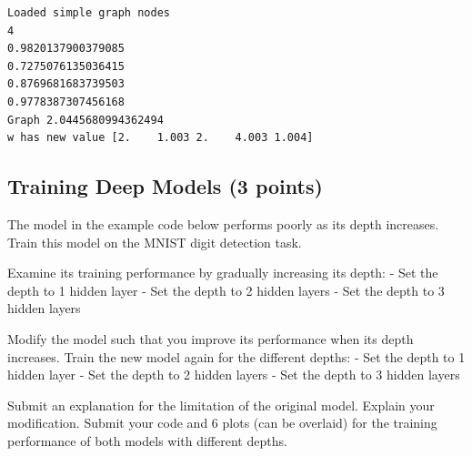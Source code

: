 \documentclass[11pt]{article}
\begin{document}
    \begin{Verbatim}[commandchars=\\\{\}]
Loaded simple graph nodes
4
0.9820137900379085
0.7275076135036415
0.8769681683739503
0.9778387307456168
Graph 2.0445680994362494
w has new value [2.    1.003 2.    4.003 1.004]

    \end{Verbatim}

    \subsection{Training Deep Models (3
points)}\label{training-deep-models-3-points}

The model in the example code below performs poorly as its depth
increases. Train this model on the MNIST digit detection task.

Examine its training performance by gradually increasing its depth: -
Set the depth to 1 hidden layer - Set the depth to 2 hidden layers - Set
the depth to 3 hidden layers

Modify the model such that you improve its performance when its depth
increases. Train the new model again for the different depths: - Set the
depth to 1 hidden layer - Set the depth to 2 hidden layers - Set the
depth to 3 hidden layers

Submit an explanation for the limitation of the original model. Explain
your modification. Submit your code and 6 plots (can be overlaid) for
the training performance of both models with different depths.
\end{document}
